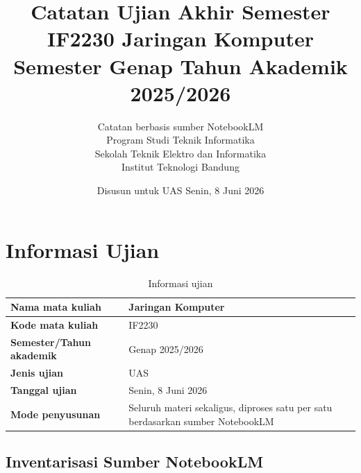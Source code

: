 \documentclass[11pt,a4paper]{article}
\title{%
    \vspace{-2cm}
    \textbf{\LARGE Catatan Ujian Akhir Semester} \\[0.25em]
    \Large IF2230 Jaringan Komputer \\[0.25em]
    \normalsize Semester Genap Tahun Akademik 2025/2026 \\[2em]
}
\author{%
    Catatan berbasis sumber NotebookLM \\[0.25em]
    Program Studi Teknik Informatika \\[0.25em]
    Sekolah Teknik Elektro dan Informatika \\[0.25em]
    Institut Teknologi Bandung \\[0.25em]
}
\date{Disusun untuk UAS Senin, 8 Juni 2026}
\begin{document}
\begin{titlepage}
    \maketitle
    \thispagestyle{empty}
\end{titlepage}

\clearpage
{}
\tableofcontents

\clearpage
{}

\section{Informasi Ujian}

\begin{table}[H]
\centering
\begin{tabularx}{\textwidth}{|L{0.32\textwidth}|X|}
\hline
\textbf{Nama mata kuliah} & Jaringan Komputer \\
\hline
\textbf{Kode mata kuliah} & IF2230 \\
\hline
\textbf{Semester/Tahun akademik} & Genap 2025/2026 \\
\hline
\textbf{Jenis ujian} & UAS \\
\hline
\textbf{Tanggal ujian} & Senin, 8 Juni 2026 \\
\hline
\textbf{Mode penyusunan} & Seluruh materi sekaligus, diproses satu per satu berdasarkan sumber NotebookLM \\
\hline
\end{tabularx}
\caption{Informasi ujian}
\label{tab:informasi-ujian}
\end{table}

\subsection*{Inventarisasi Sumber NotebookLM}
\end{document}
